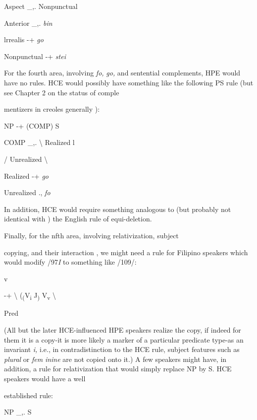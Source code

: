 \ea\label{ex:101}
Aspect \_,. Nonpunctual
\glt
\z

\ea\label{ex:102}
Anterior \_,. \textit{bin}
\glt
\z

\ea\label{ex:103}
lrrealis {}-+ \textit{go}
\glt
\z

\ea\label{ex:104}
Nonpunctual {}-+ \textit{stei}
\glt
\z


For the fourth area, involving \textit{fo,} \textit{go,} and sentential comple\-ments, HPE would have no rules. HCE would possibly have something like the following PS rule (but see Chapter 2 on the status of comple\-

mentizers in creoles generally ):

\ea\label{ex:105}
NP {}-+ (COMP) S
\glt
\z

\ea\label{ex:106}
COMP \_,. {\textbackslash} Realized l
\glt
\z

/ Unrealized {\textbackslash}

\ea\label{ex:107}
Realized {}-+ \textit{go}
\glt
\z

\ea\label{ex:108}
Unrealized ., \textit{fo}
\glt
\z

In addition, HCE would require something analogous to (but probably not identical with ) the English rule of equi-deletion.

Finally, for the nfth area, involving relativization, subject\-

copying, and their interaction , we might need a rule for Filipino speak\-ers which would modify /97\textit{I} to something like /109/:

\ea\label{ex:109}
v
\glt
\z

{}-+ {\textbackslash} (\textsubscript{(}V\textsubscript{i}\textsubscript{ }J\textsubscript{) }V\textsubscript{v}\textsubscript{ }{\textbackslash}

Pred

(All but the later HCE-influenced HPE speakers realize the copy, if indeed for them it is a copy-it is more likely a marker of a particular predicate type-as an invariant \textit{i, }i.e., in contradistinction to the HCE rule, subject features such as \textit{plural }or \textit{fem} \textit{inine} are not copied onto it.) A few speakers might have, in addition, a rule for relativization that would simply replace NP by S. HCE speakers would have a well\-

established rule:

\ea\label{ex:110}
NP \_,. S
\glt
\z


